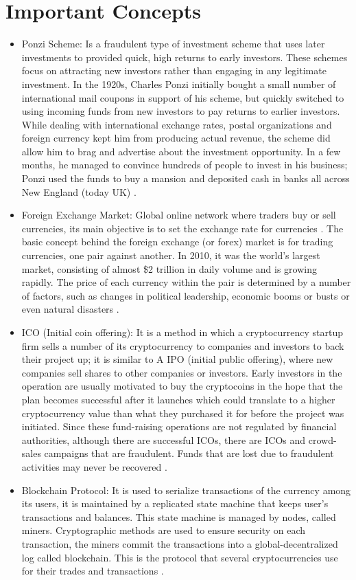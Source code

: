 \section{Important Concepts}
\begin{itemize}
\item Ponzi Scheme: Is a fraudulent type of investment scheme that uses later investments to provided quick, high returns to early investors. These schemes focus on attracting new investors rather than engaging in any legitimate investment. In the 1920s, Charles Ponzi initially bought a small number of international mail coupons in support of his scheme, but quickly switched to using incoming funds from new investors to pay returns to earlier investors. While dealing with international exchange rates, postal organizations and foreign currency kept him from producing actual revenue, the scheme did allow him to brag and advertise about the investment opportunity. In a few months, he managed to convince hundreds of people to invest in his business; Ponzi used the funds to buy a mansion and deposited cash in banks all across New England (today UK) \cite{ponzi} \cite{ezubao}.

\item Foreign Exchange Market: Global online network where traders buy or sell currencies, its main objective is to set the exchange rate for currencies \cite{foreignExchange}. The basic concept behind the foreign exchange (or forex) market is for trading currencies,
one pair against another. In 2010, it was the world’s largest market, consisting of almost \$2 trillion in daily volume and is growing rapidly. The price of each currency within the pair is determined by a number of factors, such as changes in political leadership, economic booms or busts or even natural disasters \cite{forex}. 

\item ICO (Initial coin offering): It is a method in which a cryptocurrency startup firm sells a number of its cryptocurrency to companies and investors to back their project up; it is similar to A IPO (initial public offering), where new companies sell shares to other companies or investors. Early investors in the operation are usually motivated to buy the cryptocoins in the hope that the plan becomes successful after it launches which could translate to a higher cryptocurrency value than what they purchased it for before the project was initiated. Since these fund-raising operations are not regulated by financial authorities, although there are successful ICOs, there are ICOs and crowd-sales campaigns that are fraudulent. Funds that are lost due to fraudulent activities may never be recovered \cite{ICO}.
\item Blockchain Protocol: It is used to serialize transactions of the currency among its users, it is maintained by a replicated state machine that keeps user's transactions and balances. This state machine is managed by nodes, called miners. Cryptographic methods are used to ensure security on each transaction, the miners commit the transactions into a global-decentralized log called blockchain. This is the protocol that several cryptocurrencies use for their trades and transactions \cite{blockchain}.
\end{itemize}


